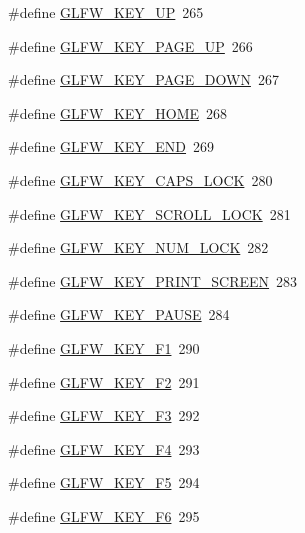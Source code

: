 \begin{DoxyCompactItemize}
\#define \hyperlink{group__keys_ga2f3342b194020d3544c67e3506b6f144}{G\+L\+F\+W\+\_\+\+K\+E\+Y\+\_\+\+U\+P}~265
\item 
\#define \hyperlink{group__keys_ga3ab731f9622f0db280178a5f3cc6d586}{G\+L\+F\+W\+\_\+\+K\+E\+Y\+\_\+\+P\+A\+G\+E\+\_\+\+U\+P}~266
\item 
\#define \hyperlink{group__keys_gaee0a8fa442001cc2147812f84b59041c}{G\+L\+F\+W\+\_\+\+K\+E\+Y\+\_\+\+P\+A\+G\+E\+\_\+\+D\+O\+W\+N}~267
\item 
\#define \hyperlink{group__keys_ga41452c7287195d481e43207318c126a7}{G\+L\+F\+W\+\_\+\+K\+E\+Y\+\_\+\+H\+O\+M\+E}~268
\item 
\#define \hyperlink{group__keys_ga86587ea1df19a65978d3e3b8439bedd9}{G\+L\+F\+W\+\_\+\+K\+E\+Y\+\_\+\+E\+N\+D}~269
\item 
\#define \hyperlink{group__keys_ga92c1d2c9d63485f3d70f94f688d48672}{G\+L\+F\+W\+\_\+\+K\+E\+Y\+\_\+\+C\+A\+P\+S\+\_\+\+L\+O\+C\+K}~280
\item 
\#define \hyperlink{group__keys_gaf622b63b9537f7084c2ab649b8365630}{G\+L\+F\+W\+\_\+\+K\+E\+Y\+\_\+\+S\+C\+R\+O\+L\+L\+\_\+\+L\+O\+C\+K}~281
\item 
\#define \hyperlink{group__keys_ga3946edc362aeff213b2be6304296cf43}{G\+L\+F\+W\+\_\+\+K\+E\+Y\+\_\+\+N\+U\+M\+\_\+\+L\+O\+C\+K}~282
\item 
\#define \hyperlink{group__keys_gaf964c2e65e97d0cf785a5636ee8df642}{G\+L\+F\+W\+\_\+\+K\+E\+Y\+\_\+\+P\+R\+I\+N\+T\+\_\+\+S\+C\+R\+E\+E\+N}~283
\item 
\#define \hyperlink{group__keys_ga8116b9692d87382afb5849b6d8907f18}{G\+L\+F\+W\+\_\+\+K\+E\+Y\+\_\+\+P\+A\+U\+S\+E}~284
\item 
\#define \hyperlink{group__keys_gafb8d66c573acf22e364049477dcbea30}{G\+L\+F\+W\+\_\+\+K\+E\+Y\+\_\+\+F1}~290
\item 
\#define \hyperlink{group__keys_ga0900750aff94889b940f5e428c07daee}{G\+L\+F\+W\+\_\+\+K\+E\+Y\+\_\+\+F2}~291
\item 
\#define \hyperlink{group__keys_gaed7cd729c0147a551bb8b7bb36c17015}{G\+L\+F\+W\+\_\+\+K\+E\+Y\+\_\+\+F3}~292
\item 
\#define \hyperlink{group__keys_ga9b61ebd0c63b44b7332fda2c9763eaa6}{G\+L\+F\+W\+\_\+\+K\+E\+Y\+\_\+\+F4}~293
\item 
\#define \hyperlink{group__keys_gaf258dda9947daa428377938ed577c8c2}{G\+L\+F\+W\+\_\+\+K\+E\+Y\+\_\+\+F5}~294
\item 
\#define \hyperlink{group__keys_ga6dc2d3f87b9d51ffbbbe2ef0299d8e1d}{G\+L\+F\+W\+\_\+\+K\+E\+Y\+\_\+\+F6}~295

\end{DoxyCompactItemize}
